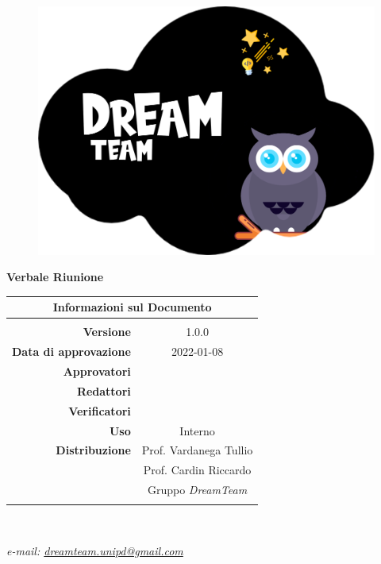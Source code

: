 \begin{center}

\begin{figure}
\centering
\includegraphics[scale=0.05]{Sezioni/images/DreamTeam.png} 
\end{figure}

{\Huge{\textbf{Verbale Riunione \D{}}}} \\ [1cm]

\begin{table}[htbp]
\centering
\begin{tabular}{r|c}
\multicolumn{2}{c}{\textbf{Informazioni sul Documento}} \\
\hline \\
\textbf{Versione} & 1.0.0 \\ \rule{0pt}{3ex}    
\textbf{Data di approvazione} & 2022-01-08 \\ \rule{0pt}{3ex}  
\textbf{Approvatori} &  \\ \rule{0pt}{3ex}      
\textbf{Redattori} & \GC{} \\ \rule{0pt}{2ex}   
\textbf{Verificatori} & \FP{}\\ \rule{0pt}{3ex}       
\textbf{Uso} & Interno \\ \rule{0pt}{3ex}    
\textbf{Distribuzione} & Prof. Vardanega Tullio \\ \rule{0pt}{2ex}   
& Prof. Cardin Riccardo \\ \rule{0pt}{2ex}   
& Gruppo \textit{DreamTeam} \\ \rule{0pt}{0.1cm}   
\end{tabular} \\ [0.5cm]
\end{table}

\textsl{ e-mail: \href{mailto:dreamteam.unipd@gmail.com}{dreamteam.unipd@gmail.com} } \\[2cm]
\end{center}
\pagebreak